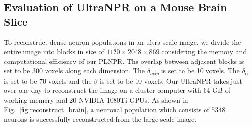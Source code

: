 
\subsection{Evaluation of UltraNPR on a Mouse Brain Slice}
\label{sec:exp_UltraNPR}

To reconstruct dense neuron populations in an ultra-scale image, we divide the entire image into blocks in size of $1120\times 2048\times 869$ considering the memory and computational efficiency of our PLNPR.
The overlap between adjacent blocks is set to be $300$ voxels along each dimension. 
The $\delta_{ovlp}$ is set to be 10 voxels.
The $\delta_{\alpha}$ is set to be 70 voxels and the $\beta$ is set to be 10 voxels.
%
Our UltraNPR takes just over one day  to reconstruct the image on a cluster computer with $64$ GB of working memory and 20 NVIDIA 1080Ti GPUs.
%
As shown in Fig.~\ref{fig:reconstruct_brain}, a neuronal population which consists of $5348$ neurons is successfully reconstructed from the large-scale image.


